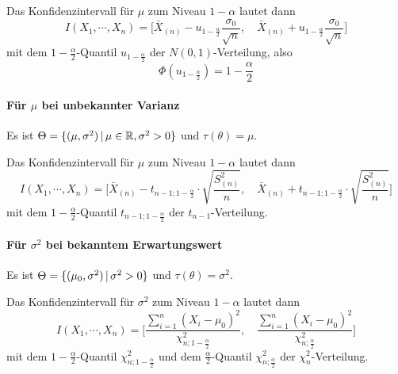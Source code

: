 				Das Konfidenzintervall für \(\mu\) zum Niveau \( 1 - \alpha \) lautet dann
				\begin{equation*}
					I(X_1, \cdots, X_n) = \Bigg[ \bar{X}_{(n)} - u_{1 - \frac{\alpha}{2}} \frac{\sigma_0}{\sqrt{n}}, \quad \bar{X}_{(n)} + u_{1 - \frac{\alpha}{2}} \frac{\sigma_0}{\sqrt{n}} \Bigg]
				\end{equation*}
				mit dem \( 1 - \frac{\alpha}{2} \)-Quantil \( u_{ 1 - \frac{\alpha}{2} } \) der \( N(0, 1) \)-Verteilung, also
				\begin{equation*}
					\Phi(u_{ 1 - \frac{\alpha}{2} }) = 1 - \frac{\alpha}{2}
				\end{equation*}

			\paragraph{Für \(\mu\) bei unbekannter Varianz}
				Es ist \( \Theta = \{ (\mu, \sigma^2) \,\vert\, \mu \in \mathbb{R}, \sigma^2 > 0 \} \) und \( \tau(\theta) = \mu \).

				Das Konfidenzintervall für \(\mu\) zum Niveau \( 1 - \alpha \) lautet dann
				\begin{equation*}
					I(X_1, \cdots, X_n) = \Bigg[ \bar{X}_{(n)} - t_{ n - 1; 1 - \frac{\alpha}{2} } \cdot \sqrt{\frac{S_{(n)}^2}{n}}, \quad \bar{X}_{(n)} + t_{ n - 1; 1 - \frac{\alpha}{2} } \cdot \sqrt{\frac{S_{(n)}^2}{n}} \Bigg]
				\end{equation*}
				mit dem \( 1 - \frac{\alpha}{2} \)-Quantil \( t_{ n - 1; 1 - \frac{\alpha}{2} } \) der \( t_{n-1} \)-Verteilung.

			\paragraph{Für \(\sigma^2\) bei bekanntem Erwartungswert}
				Es ist \( \Theta = \{ (\mu_0, \sigma^2) \,\vert\, \sigma^2 > 0 \} \) und \( \tau(\theta) = \sigma^2 \).

				Das Konfidenzintervall für \(\sigma^2\) zum Niveau \( 1 - \alpha \) lautet dann
				\begin{equation*}
					I(X_1, \cdots, X_n) = \Bigg[ \frac{\sum_{i = 1}^{n} (X_i - \mu_0)^2}{\chi_{n; 1 - \frac{\alpha}{2}}^2}, \quad \frac{\sum_{i = 1}^{n} (X_i - \mu_0)^2}{\chi_{n; \frac{\alpha}{2}}^2} \Bigg]
				\end{equation*}
				mit dem \( 1-\frac{\alpha}{2} \)-Quantil \( \chi_{n; 1 - \frac{\alpha}{2}}^2 \) und dem \( \frac{\alpha}{2} \)-Quantil \( \chi_{n; \frac{\alpha}{2}}^2 \) der \( \chi_n^2 \)-Verteilung.


